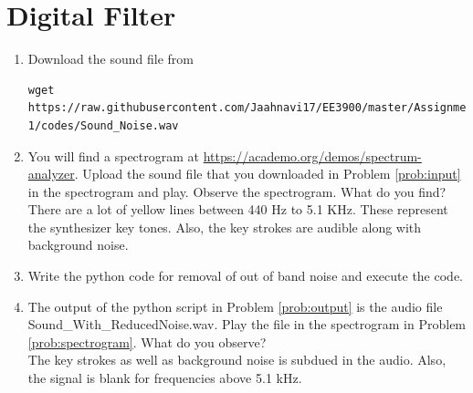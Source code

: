 \documentclass[journal,12pt,twocolumn]{IEEEtran}
\renewcommand\thesection{\arabic{section}}
\begin{document}
\section{Digital Filter}
\begin{enumerate}[label=\thesection.\arabic*
,ref=\thesection.\theenumi]
\item
\label{prob:input}
Download the sound file from  
\begin{lstlisting}
wget https://raw.githubusercontent.com/Jaahnavi17/EE3900/master/Assignment-1/codes/Sound_Noise.wav
\end{lstlisting}
\item
\label{prob:spectrogram}
You will find a spectrogram at \href{https://academo.org/demos/spectrum-analyzer}{\url{https://academo.org/demos/spectrum-analyzer}}. 
%
Upload the sound file that you downloaded in Problem \ref{prob:input} in the spectrogram  and play.  Observe the spectrogram. What do you find?
\\
%
\solution There are a lot of yellow lines between 440 Hz to 5.1 KHz.  These represent the synthesizer key tones. Also, the key strokes
are audible along with background noise.
\item
\label{prob:output}
Write the python code for removal of out of band noise and execute the code.
\\
\solution

% 
\item
The output of the python script in Problem \ref{prob:output} is the audio file Sound\_With\_ReducedNoise.wav. Play the file in the spectrogram in Problem \ref{prob:spectrogram}. What do you observe?
\\
\solution The key strokes as well as background noise is subdued in the audio.  Also,  the signal is blank for frequencies above 5.1 kHz.

\end{enumerate}
\end{document}
